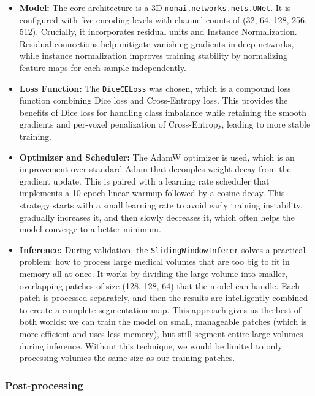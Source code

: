 \begin{itemize}
    \item \textbf{Model:} The core architecture is a 3D \texttt{monai.networks.nets.UNet}. It is configured with five encoding levels with channel counts of (32, 64, 128, 256, 512). Crucially, it incorporates residual units and Instance Normalization. Residual connections help mitigate vanishing gradients in deep networks, while instance normalization improves training stability by normalizing feature maps for each sample independently.

    \item \textbf{Loss Function:} The \texttt{DiceCELoss} was chosen, which is a compound loss function combining Dice loss and Cross-Entropy loss. This provides the benefits of Dice loss for handling class imbalance while retaining the smooth gradients and per-voxel penalization of Cross-Entropy, leading to more stable training.

    \item \textbf{Optimizer and Scheduler:} The AdamW optimizer is used, which is an improvement over standard Adam that decouples weight decay from the gradient update. This is paired with a learning rate scheduler that implements a 10-epoch linear warmup followed by a cosine decay. This strategy starts with a small learning rate to avoid early training instability, gradually increases it, and then slowly decreases it, which often helps the model converge to a better minimum.

    \item \textbf{Inference:} During validation, the \texttt{SlidingWindowInferer} solves a practical problem: how to process large medical volumes that are too big to fit in memory all at once. It works by dividing the large volume into smaller, overlapping patches of size (128, 128, 64) that the model can handle. Each patch is processed separately, and then the results are intelligently combined to create a complete segmentation map. This approach gives us the best of both worlds: we can train the model on small, manageable patches (which is more efficient and uses less memory), but still segment entire large volumes during inference. Without this technique, we would be limited to only processing volumes the same size as our training patches.
\end{itemize}

\subsubsection{Post-processing}
\label{subsubsec:postprocessing}

